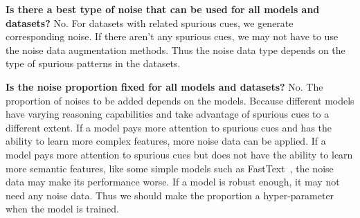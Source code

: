 \textbf{Is there a best type of noise that can be used for all models and datasets?} 
No. For datasets with related spurious cues,
we generate corresponding noise. If there aren't any spurious cues, we 
may not have to use the noise data augmentation methods. 
Thus the noise data 
type depends on the type of spurious patterns in the datasets.

\noindent\textbf{Is the noise proportion fixed for all models and datasets?} 
No. The proportion of noises to be added depends on the models. 
Because different models have varying reasoning capabilities and 
take advantage of spurious cues to a different extent. 
If a model pays more attention to spurious cues 
and has the ability to learn more complex features, more noise data can be applied. 
If a model pays more attention to spurious cues but does not have the 
ability to learn more semantic features, 
like some simple models such as FastText~\cite{joulin2017bag}, 
the noise data may make its performance worse. If 
a model is robust enough, it may not need any noise data.  
Thus we should make the proportion a hyper-parameter when the model is trained.




